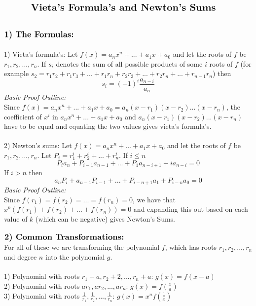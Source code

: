 \documentclass{article}
\begin{document}
$\centerline{\Large \textbf{Vieta's Formula's and Newton's Sums}}$
\\
\\
\\
$\large \textbf{1)  The Formulas:}$  \\
\\
1) Vieta's formula's: Let $f(x)=a_nx^n+...+a_1x+a_0$ and let the roots of $f$ be $r_1,r_2,...,r_n$. If $s_i$ denotes the sum of all possible products of some $i$ roots of $f$ (for example $s_2=r_1r_2+r_1r_3+...+r_1r_n+r_2r_3+...+r_2r_n+...+r_{n-1}r_n$) then
\begin{equation}
s_i=(-1)^i\frac{a_{n-i}}{a_n}
\end{equation} 
\textit{Basic Proof Outline:}\\
Since $f(x)=a_nx^n+...+a_1x+a_0=a_n(x-r_1)(x-r_2)...(x-r_n)$, the coefficient of $x^i$ in $a_nx^n+...+a_1x+a_0$ and $a_n(x-r_1)(x-r_2)...(x-r_n)$ have to be equal and equating the two values gives vieta's formula's.
\\
\\
2) Newton's sums: Let $f(x)=a_nx^n+...+a_1x+a_0$ and let the roots of $f$ be $r_1,r_2,...,r_n$. Let $P_i=r_1^i+r_2^i+...+r_n^i$. If $i\le n$
\begin{equation} 
P_ia_n+P_{i-1}a_{n-1}+...+P_1a_{n-i+1}+ia_{n-i}=0
\end{equation}
If $i>n$ then
\begin{equation} 
a_nP_i+a_{n-1}P_{i-1}+...+P_{i-n+1}a_{1}+P_{i-n}a_0=0
\end{equation}
\textit{Basic Proof Outline:}\\
Since $f(r_1)=f(r_2)=...=f(r_n)=0$, we have that $x^k(f(r_1)+f(r_2)+...+f(r_n))=0$ and expanding this out based on each value of $k$ (which can be negative) gives  Newton's Sums.
\\
\\
$\large \textbf{2) Common Transformations:}$  \\
For all of these we are transforming the polynomial $f$, which has roots $r_1,r_2,...,r_n$ and degree $n$ into the polynomial $g$.
\\
\\
1) Polynomial with roots $r_1+a,r_2+2,...,r_n+a$: $g(x)=f(x-a)$\\
2) Polynomial with roots $ar_1, ar_2,...,ar_n$: $g(x)=f(\frac{x}{a})$\\
3) Polynomial with roots $\frac{1}{r_1},\frac{1}{r_2},...,\frac{1}{r_n}$: $g(x)=x^nf(\frac{1}{x})$
\\
\\	
\end{document}
